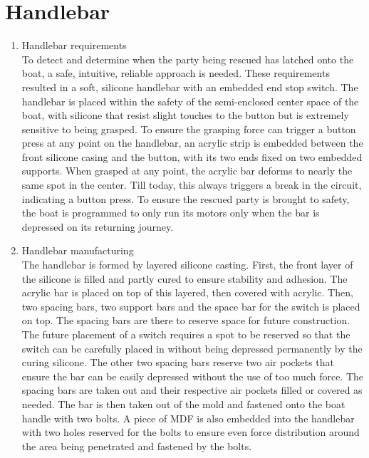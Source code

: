 \documentclass{article}[10pt]
\begin{document}
\section{Handlebar}
\begin{enumerate}

\item Handlebar requirements\\
To detect and determine when the party being rescued has latched onto the boat, a safe, intuitive, reliable approach is needed. These requirements resulted in a soft, silicone handlebar with an embedded end stop switch. The handlebar is placed within the safety of the semi-enclosed center space of the boat, with silicone that resist slight touches to the button but is extremely sensitive to being grasped. 
To ensure the grasping force can trigger a button press at any point on the handlebar, an acrylic strip is embedded between the front silicone casing and the button, with its two ends fixed on two embedded supports. When grasped at any point, the acrylic bar deforms to nearly the same spot in the center. Till today, this always triggers a break in the circuit, indicating a button press. To ensure the rescued party is brought to safety, the boat is programmed to only run its motors only when the bar is depressed on its returning journey. 
\item Handlebar manufacturing\\
The handlebar is formed by layered silicone casting. First, the front layer of the silicone is filled and partly cured to ensure stability and adhesion. The acrylic bar is placed on top of this layered, then covered with acrylic. Then, two spacing bars, two support bars and the space bar for the switch is placed on top. The spacing bars are there to reserve space for future construction. The future placement of a switch requires a spot to be reserved so that the switch can be carefully placed in without being depressed permanently by the curing silicone. The other two spacing bars reserve two air pockets that ensure the bar can be easily depressed without the use of too much force. The spacing bars are taken out and their respective air pockets filled or covered as needed. The bar is then taken out of the mold and fastened onto the boat handle with two bolts. A piece of MDF is also embedded into the handlebar with two holes reserved for the bolts to ensure even force distribution around the area being penetrated and fastened by the bolts. 
\end{enumerate}
\end{document}
